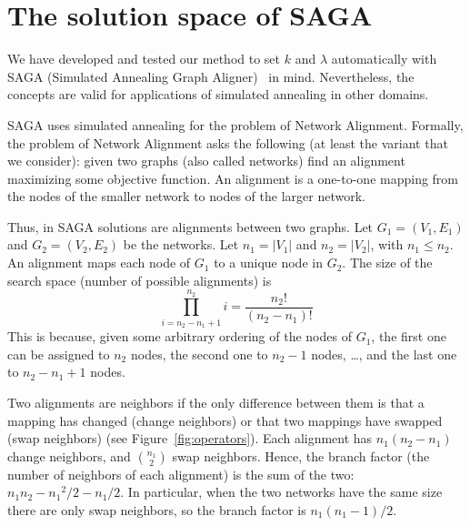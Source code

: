 \documentclass[]{article}
\begin{document}
\section{The solution space of SAGA}
We have developed and tested our method to set $k$ and $\lambda$ automatically with SAGA (Simulated Annealing Graph Aligner)~\cite{SAGA} in mind. Nevertheless, the concepts are valid for applications of simulated annealing in other domains. 

SAGA uses simulated annealing for the problem of Network Alignment. Formally, the problem of Network Alignment asks the following (at least the variant that we consider): given two graphs (also called networks) find an alignment maximizing some objective function. An alignment is a one-to-one mapping from the nodes of the smaller network to nodes of the larger network.

Thus, in SAGA solutions are alignments between two graphs. Let $G_1=(V_1,E_1)$ and $G_2=(V_2,E_2)$ be the networks. Let $n_1=|V_1|$ and $n_2=|V_2|$, with $n_1\leq n_2$. An alignment maps each node of $G_1$ to a unique node in $G_2$. The size of the search space (number of possible alignments) is
$$\prod_{i=n_2-n_1+1}^{n_2}i=\frac{n_2!}{(n_2-n_1)!}$$
This is because, given some arbitrary ordering of the nodes of $G_1$, the first one can be assigned to $n_2$ nodes, the second one to $n_2-1$ nodes, \ldots, and the last one to $n_2-n_1+1$ nodes.

Two alignments are neighbors if the only difference between them is that a mapping has changed (change neighbors) or that two mappings have swapped (swap neighbors) (see Figure~\ref{fig:operators}). Each alignment has $n_1 (n_2-n_1)$ change neighbors, and ${n_1\choose 2}$ swap neighbors. Hence, the branch factor (the number of neighbors of each alignment) is the sum of the two: $n_1 n_2 - {n_1}^2/2-n_1/2$. In particular, when the two networks have the same size there are only swap neighbors, so the branch factor is $n_1(n_1-1)/2$.
\end{document}
